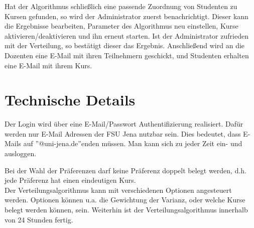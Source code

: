         Hat der Algorithmus schließlich eine passende Zuordnung von Studenten zu Kursen gefunden, so wird der Administrator zuerst benachrichtigt.
        Dieser kann die Ergebnisse bearbeiten, Parameter des Algorithmus neu einstellen, Kurse aktivieren/deaktivieren und ihn erneut starten.
        Ist der Administrator zufrieden mit der Verteilung, so bestätigt dieser das Ergebnis.
        Anschließend wird an die Dozenten eine E-Mail mit ihren Teilnehmern geschickt, und Studenten erhalten eine E-Mail mit ihrem Kurs.
    
    \section{Technische Details}
        
        Der Login wird über eine E-Mail/Passwort Authentifizierung realisiert.
        Dafür werden nur E-Mail Adressen der FSU Jena nutzbar sein. Dies bedeutet, dass E-Mails auf ''@uni-jena.de''enden müssen.
        Man kann sich zu jeder Zeit ein- und ausloggen.\newline
        
        Bei der Wahl der Präferenzen darf keine Präferenz doppelt belegt werden, d.h. jede Präferenz hat einen eindeutigen Kurs. \\ %
        
        Der Verteilungsalgorithmus kann mit verschiedenen Optionen angesteuert werden. Optionen können u.a. die Gewichtung der Varianz, oder welche Kurse belegt werden können, sein. Weiterhin ist der Verteilungsalgorithmus innerhalb von 24 Stunden fertig. \\
        
